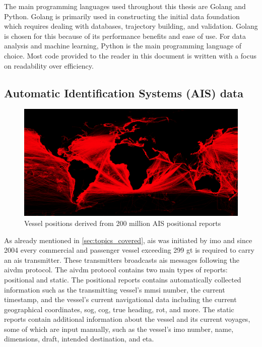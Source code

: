 The main programming languages used throughout this thesis are Golang and Python. Golang is primarily used in constructing the initial data foundation which requires dealing with databases, trajectory building, and validation. Golang is chosen for this because of its performance benefits and ease of use. For data analysis and machine learning, Python is the main programming language of choice. Most code provided to the reader in this document is written with a focus on readability over efficiency.

\subsection{Automatic Identification Systems (AIS) data}
\label{sec:ais_data}

\begin{figure}[htbp]  %
    \centering
    \includegraphics[width=1.0\textwidth]{figures/ais.png}
    \caption{Vessel positions derived from 200 million AIS positional reports}
    \label{fig:ais_positions}
\end{figure}

As already mentioned in \cref{sec:topics_covered}, \acrfull{ais} was initiated by \acrfull{imo} and since 2004 every commercial and passenger vessel exceeding 299 \acrfull{gt} is required to carry an \acrshort{ais} transmitter. These transmitters broadcasts \acrshort{ais} messages following the \gls{aivdm} protocol. The \gls{aivdm} protocol contains two main types of reports: positional and static. The positional reports contains automatically collected information such as the transmitting vessel's \acrfull{mmsi} number, the current timestamp, and the vessel's current navigational data including the current geographical coordinates, \acrfull{sog}, \acrfull{cog}, true heading, \acrfull{rot}, and more. The static reports contain additional information about the vessel and its current voyages, some of which are input manually, such as the vessel's \acrshort{imo} number, name, dimensions, draft, intended destination, and \acrfull{eta}.

